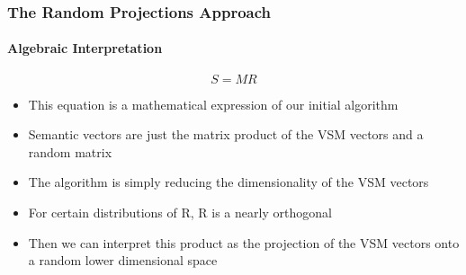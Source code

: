 \documentclass{beamer}
\begin{document}
\begin{frame}
  	\frametitle{The Random Projections Approach}
  	\framesubtitle{Algebraic Interpretation}
  	\begin{equation}
S=MR
\end{equation}
\begin{itemize}
  \item This equation is a mathematical expression of our initial algorithm
  \item Semantic vectors are just the matrix product of the VSM vectors and a random matrix
  \item The algorithm is simply reducing the dimensionality of the VSM vectors
  \item For certain distributions of R, R is a nearly orthogonal
  \item Then we can interpret this product as the projection of the VSM vectors onto a random lower dimensional space
\end{itemize}
\end{frame}
\end{document}
